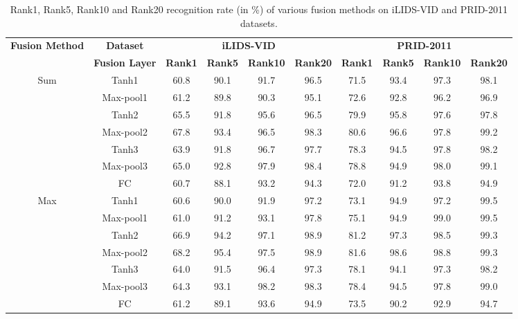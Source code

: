 \documentclass[journal]{IEEEtran}
\begin{document}
\begin{table*}[htbp]
	\linespread{1.3}\selectfont
	\centering
	\caption{Rank1, Rank5, Rank10 and Rank20 recognition rate (in \%) of various fusion methods on iLIDS-VID and PRID-2011 datasets. }
	\begin{tabular}{c|c|cccc|cccc}
		\hline
		\multirow{2}{*}{\textbf{Fusion Method}} &\textbf{Dataset} &\multicolumn{4}{c|}{\textbf{iLIDS-VID}}&\multicolumn{4}{c}{\textbf{PRID-2011}}\\
		\cline{2-10}
		&\textbf{Fusion Layer} & \textbf{Rank1} & \textbf{Rank5} & \textbf{Rank10} & \textbf{Rank20} & \textbf{Rank1} & \textbf{Rank5} & \textbf{Rank10} & \textbf{Rank20}\\
		\hline
		
		\multirow{7}{*}{Sum} &{Tanh1} & 60.8 & 90.1 & 91.7 & 96.5 &71.5 & 93.4&97.3 &98.1\\
		&{Max-pool1} & 61.2 & 89.8 & 90.3 & 95.1 &72.6 & 92.8&96.2 &96.9\\
		&{Tanh2} & 65.5 & 91.8 & 95.6 & 96.5 &79.9 & 95.8&97.6 &97.8\\
		&{Max-pool2} & 67.8 & 93.4 & 96.5 & 98.3 & 80.6 & 96.6 & 97.8 & 99.2 \\
		&{Tanh3} & 63.9 & 91.8 & 96.7 & 97.7 &78.3 & 94.5&97.8 &98.2\\
		&{Max-pool3} & 65.0 & 92.8 & 97.9 & 98.4 &78.8 & 94.9&98.0 &99.1\\
		&{FC} & 60.7 & 88.1 & 93.2 & 94.3 &72.0 & 91.2&93.8 &94.9\\
		\hline
		
		\multirow{7}{*}{Max}&{Tanh1} & 60.6 & 90.0 & 91.9 & 97.2 &73.1 & 94.9 &97.2 &99.5\\
		&{Max-pool1} & 61.0 & 91.2 & 93.1 & 97.8 &75.1 & 94.9&99.0 &99.5\\
		&{Tanh2} & 66.9 & 94.2 & 97.1 & 98.9 &81.2 & 97.3&98.5 &99.3\\
		&{Max-pool2} & 68.2 & 95.4 & 97.5 & 98.9 & 81.6 & 98.6 & 98.8 & 99.3 \\
		&{Tanh3} & 64.0 & 91.5& 96.4 & 97.3 &78.1 & 94.1&97.3 &98.2\\
		&{Max-pool3} & 64.3 & 93.1 & 98.2 & 98.3 &78.4 & 94.5&97.8 &99.0\\
		&{FC} & 61.2 & 89.1 & 93.6 & 94.9 &73.5 & 90.2&92.9 &94.7\\
		

\end{tabular}
\end{table*}
\end{document}
